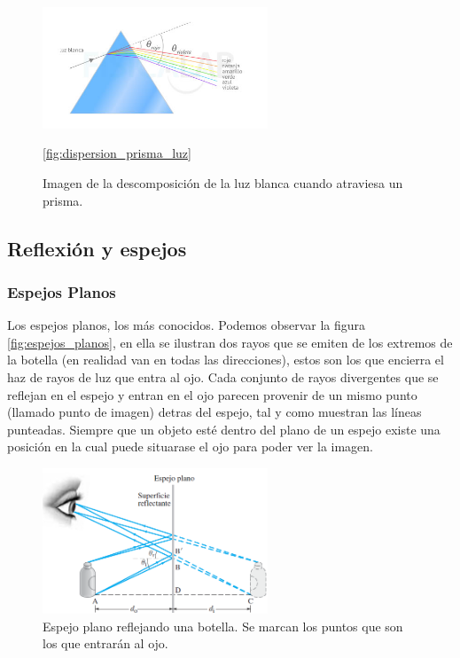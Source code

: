 \begin{figure}[H]
	\centering
	\includegraphics[width=0.6\textwidth]{images/descomposicion_luz.jpg}
	\caption{Imagen de la descomposición de la luz blanca cuando atraviesa un prisma.}
	\ref{fig:dispersion_prisma_luz}
\end{figure}





\subsection{Reflexión y espejos}

\subsubsection*{Espejos Planos}
Los espejos planos, los más conocidos. Podemos observar la figura \ref{fig:espejos_planos}, en ella se ilustran dos rayos que se emiten de los extremos de la botella (en realidad van en todas las direcciones), estos son los que encierra el haz de rayos de luz que entra al ojo. Cada conjunto de rayos divergentes que se reflejan en el espejo y entran en el ojo parecen provenir de un mismo punto (llamado punto de imagen) detras del espejo, tal y como muestran las líneas punteadas. Siempre que un objeto esté dentro del plano de un espejo existe una posición en la cual puede situarase el ojo para poder ver la imagen. 

\begin{figure}[H]
	\centering
	\includegraphics[width=0.6\textwidth]{images/espejo_plano.png}
	\caption{Espejo plano reflejando una botella. Se marcan los puntos que son los que entrarán al ojo.}
	\label{fig:esplejos_planos}
\end{figure}

